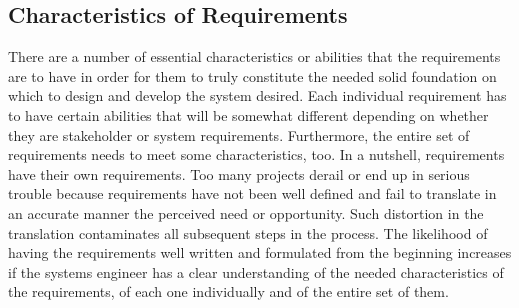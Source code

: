 \subsection{Characteristics of Requirements}

There are a number of essential characteristics or abilities that the requirements are to have in order for them to truly constitute the needed solid foundation on which to design and develop the system desired. Each individual requirement has to have certain abilities that will be somewhat different depending on whether they are stakeholder or system requirements. Furthermore, the entire set of requirements needs to meet some characteristics, too. In a nutshell, requirements have their own requirements. Too many projects derail or end up in serious trouble because requirements have not been well defined and fail to translate in an accurate manner the perceived need or opportunity. Such distortion in the translation contaminates all subsequent steps in the process. The likelihood of having the requirements well written and formulated from the beginning increases if the systems engineer has a clear understanding of the needed characteristics of the requirements, of each one individually and of the entire set of them.

